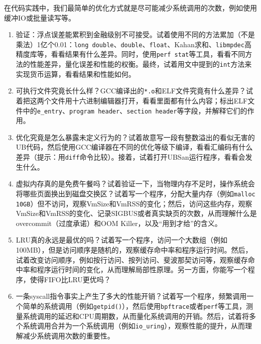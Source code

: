 在代码实践中，我们最简单的优化方式就是尽可能减少系统调用的次数，例如使用缓冲IO或批量读写等。

\begin{thinking}
  \begin{enumerate}
    \item 验证：浮点误差能累积到金融级别不可接受。试着使用不同的方法累加（不是乘法）1亿个0.01：\texttt{long double}、\texttt{double}、\texttt{float}、Kahan求和、\texttt{libmpdec}高精度库等，看看结果有什么差异。同时，使用\texttt{perf stat}等工具，看看不同方法的性能差异，量化误差和性能的权衡。最终，试着用文中提到的\texttt{int}方法来实现货币运算，看看结果和性能如何。
    \item 可执行文件究竟长什么样？GCC编译出的\texttt{*.o}和ELF文件究竟有什么差异？试着把这两个文件用十六进制编辑器打开，看看里面都有什么内容；标出ELF文件中的\texttt{e\_entry}、\texttt{program header}、\texttt{section header}等字段，并解释它们的作用。
    \item 优化究竟是怎么暴露未定义行为的？试着故意写一段有整数溢出的看似无害的UB代码，然后使用GCC编译器在不同的优化等级下编译，看看汇编码有什么差异（提示：用\texttt{diff}命令比较）。接着，试着打开UBSan运行程序，看看会发生什么。
    \item 虚拟内存真的是免费午餐吗？试着验证一下，当物理内存不足时，操作系统会将哪些页面换出到磁盘交换区？试着写一个程序，分配大量内存（例如\texttt{malloc 10GB}）但不访问，观察VmSize和VmRSS的变化；然后，访问这些内存，观察VmSize和VmRSS的变化、记录SIGBUS或者真实缺页的次数，从而理解什么是overcommit（过度承诺）和OOM Killer，以及“用到才给”的含义。
    \item LRU真的永远是最优的吗？试着写一个程序，访问一个大数组（例如100MB），但是访问顺序是随机的，观察缓存命中率和程序运行时间。然后，试着改变访问顺序，例如按行访问、按列访问、斐波那契访问等，观察缓存命中率和程序运行时间的变化，从而理解局部性原理。另一方面，你能写一个程序，使得FIFO比LRU更优吗？
    \item 一条syscall指令事实上产生了多大的性能开销？试着写一个程序，频繁调用一个简单的系统调用（例如\texttt{getpid()}），然后使用\texttt{bpftrace}或者\texttt{perf}等工具，测量系统调用的延迟和CPU周期数，从而量化系统调用的开销。然后，试着将多个系统调用合并为一个系统调用（例如\texttt{io\_uring}），观察性能的提升，从而理解减少系统调用次数的重要性。
  \end{enumerate}
\end{thinking}
